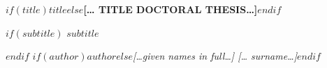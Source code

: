 \documentclass[$if(fontsize)$$fontsize$,$endif$$if(papersize)$$papersize$paper,twoside,$endif$$for(classoption)$$classoption$$sep$,$endfor$]{$documentclass$} %
\begin{document}
\frontmatter
\thispagestyle{empty}
\def\drop{.1\textheight}

\vspace*{\drop}
\begin{center}
\huge\textbf{\uppercase{$if(title)$$title$$else$[… Title Doctoral Thesis…]$endif$}}\par
$if(subtitle)$
\medskip
\Large\uppercase{$subtitle$}\par
$endif$
\vspace{\baselineskip}
{\Large \textit{$if(author)$$author$$else$[…given names in full…] [… surname…]$endif$}}
\end{center}


\clearpage\shipout\null



\end{document}
